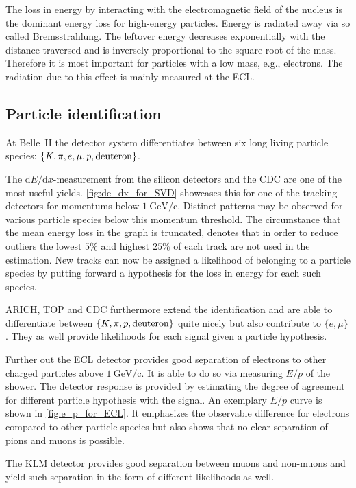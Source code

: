 The loss in energy by interacting with the electromagnetic field of the nucleus is the dominant energy loss for high-energy particles. Energy is radiated away via so called Bremsstrahlung. The leftover energy decreases exponentially with the distance traversed and is inversely proportional to the square root of the mass. Therefore it is most important for particles with a low mass, e.g., electrons. The radiation due to this effect is mainly measured at the ECL.

\subsection{Particle identification}
\label{subsec:particle_identification}

At Belle~\RN{2} the detector system differentiates between six long living particle species: $\{K, \pi, e, \mu, p, \hbox{deuteron}\}$.

The $\mathrm{d}E/\mathrm{d}x$-measurement from the silicon detectors and the CDC are one of the most useful yields. \autoref{fig:de_dx_for_SVD} showcases this for one of the tracking detectors for momentums below $1 \mathrm{~GeV/c}$. Distinct patterns may be observed for various particle species below this momentum threshold. The circumstance that the mean energy loss in the graph is truncated, denotes that in order to reduce outliers the lowest $5\%$ and highest $25\%$ of each track are not used in the estimation.
New tracks can now be assigned a likelihood of belonging to a particle species by putting forward a hypothesis for the loss in energy for each such species.

ARICH, TOP and CDC furthermore extend the identification and are able to differentiate between $\{K, \pi, p, \hbox{deuteron}\}$ quite nicely but also contribute to $\{e, \mu\}$. They as well provide likelihoods for each signal given a particle hypothesis.

Further out the ECL detector provides good separation of electrons to other charged particles above $1 \mathrm{~GeV/c}$. It is able to do so via measuring $E/p$ of the shower. The detector response is provided by estimating the degree of agreement for different particle hypothesis with the signal. An exemplary $E/p$ curve is shown in \autoref{fig:e_p_for_ECL}. It emphasizes the observable difference for electrons compared to other particle species but also shows that no clear separation of pions and muons is possible.

The KLM detector provides good separation between muons and non-muons and yield such separation in the form of different likelihoods as well.

